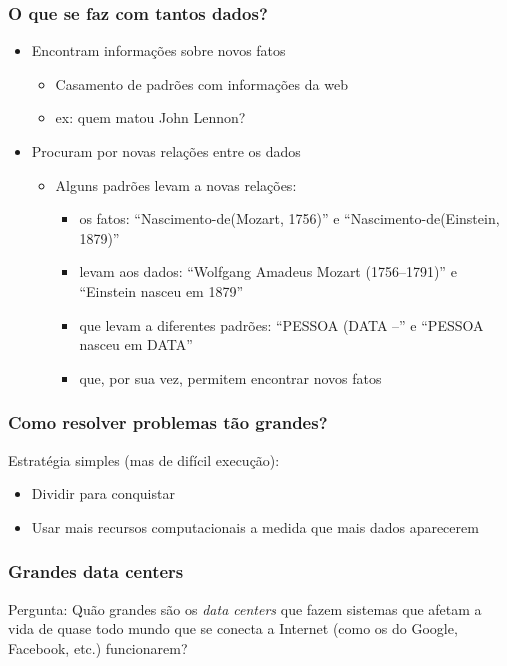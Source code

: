 \documentclass[Ligatures=TeX,table,brazil,svgnames,usetotalslideindicator,comp
ress,10pt]{beamer}
\begin{document}
\begin{frame}
  \frametitle{O que se faz com tantos dados?}

  \begin{itemize}
  \item Encontram informações sobre novos fatos
    \begin{itemize}
    \item Casamento de padrões com informações da web
    \item ex: quem matou John Lennon?
    \end{itemize}
  \item<2-> Procuram por novas relações entre os dados
    \begin{itemize}
    \item<2-> Alguns padrões levam a novas relações:
      \begin{itemize}
      \item<3-> os fatos: ``Nascimento-de(Mozart, 1756)'' e ``Nascimento-de(Einstein, 1879)''
      \item<4-> levam aos dados: ``Wolfgang Amadeus Mozart
        (1756--1791)'' e ``Einstein nasceu em 1879''
      \item<5-> que levam a diferentes padrões: ``PESSOA (DATA --'' e ``PESSOA nasceu em DATA''
      \item<6-> que, por sua vez, permitem encontrar novos fatos
      \end{itemize}
    \end{itemize}
  \end{itemize}

\end{frame}

\begin{frame}
  \frametitle{Como resolver problemas tão grandes?}

  Estratégia simples (mas de difícil execução):

  \begin{itemize}
  \item Dividir para conquistar
  \item Usar mais recursos computacionais a medida que mais dados aparecerem
  \end{itemize}

\end{frame}

\begin{frame}
  \frametitle{Grandes data centers}

  \begin{block}{Pergunta:}
    Quão grandes são os \textit{data centers} que fazem sistemas que
    afetam a vida de quase todo mundo que se conecta a Internet (como
    os do Google, Facebook, etc.) funcionarem?
  \end{block}

\end{frame}
\end{document}
